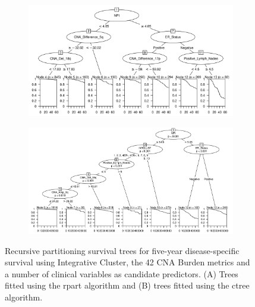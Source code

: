 \begin{figure}[!h]
\centering

\vspace{1cm}

\begin{subfigure}{\textwidth}
\subcaption{}
\includegraphics[width=1\textwidth]{../figures/Chapter_3/Clin_PA_PartyKit_Survival_Burden_FiveYearDSS_INTCLUST.png}
\end{subfigure}

\vspace{2cm}

\begin{subfigure}{\textwidth}
\subcaption{}
\includegraphics[width=1\textwidth]{../figures/Chapter_3/Clin_PA_Ctree_Survival_Burden_FiveYearDSS_INTCLUST.png}
\end{subfigure}

\vspace{1cm}

\caption[Recursive partitioning survival trees for five-year disease-specific survival using Integrative Cluster, the 42 CNA Burden metrics and a number of clinical variables as candidate predictors.]{Recursive partitioning survival trees for five-year disease-specific survival using Integrative Cluster, the 42 CNA Burden metrics and a number of clinical variables as candidate predictors. (A) Trees fitted using the rpart algorithm and (B) trees fitted using the ctree algorithm.}
\label{fig:PA_INTCLUST_CNA_Burden_FiveYearDSS_Clin}
\end{figure}

